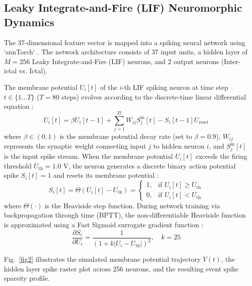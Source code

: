 \documentclass[pdflatex,sn-mathphys-num]{sn-jnl}%
\begin{document}
\subsection{Leaky Integrate-and-Fire (LIF) Neuromorphic Dynamics}\label{sec2_2}

The 37-dimensional feature vector is mapped into a spiking neural network using `snnTorch` \cite{eshraghian2023training}. The network architecture consists of 37 input units, a hidden layer of $M = 256$ Leaky Integrate-and-Fire (LIF) neurons, and 2 output neurons (Inter-ictal vs. Ictal).

The membrane potential $U_i[t]$ of the $i$-th LIF spiking neuron at time step $t \in \{1 \dots T\}$ ($T = 80$ steps) evolves according to the discrete-time linear differential equation \cite{gerstner2014neuronal}:
\begin{equation}
U_i[t] = \beta U_i[t-1] + \sum_{j=1}^{37} W_{ij} S_j^{\text{in}}[t] - S_i[t-1] U_{\text{reset}}
\end{equation}
where $\beta \in (0, 1)$ is the membrane potential decay rate (set to $\beta = 0.9$), $W_{ij}$ represents the synaptic weight connecting input $j$ to hidden neuron $i$, and $S_j^{\text{in}}[t]$ is the input spike stream. When the membrane potential $U_i[t]$ exceeds the firing threshold $U_{\text{th}} = 1.0\text{ V}$, the neuron generates a discrete binary action potential spike $S_i[t] = 1$ and resets its membrane potential \cite{eshraghian2023training}:
\begin{equation}
S_i[t] = \Theta(U_i[t] - U_{\text{th}}) = \begin{cases} 1, & \text{if } U_i[t] \ge U_{\text{th}} \\ 0, & \text{if } U_i[t] < U_{\text{th}} \end{cases}
\end{equation}
where $\Theta(\cdot)$ is the Heaviside step function. During network training via backpropagation through time (BPTT), the non-differentiable Heaviside function is approximated using a Fast Sigmoid surrogate gradient function \cite{eshraghian2023training}:
\begin{equation}
\frac{\partial S_i}{\partial U_i} = \frac{1}{(1 + k \vert U_i - U_{\text{th}} \vert)^2}, \quad k = 25
\end{equation}

Fig.~\ref{fig2} illustrates the simulated membrane potential trajectory $V(t)$, the hidden layer spike raster plot across 256 neurons, and the resulting event spike sparsity profile.
\end{document}

